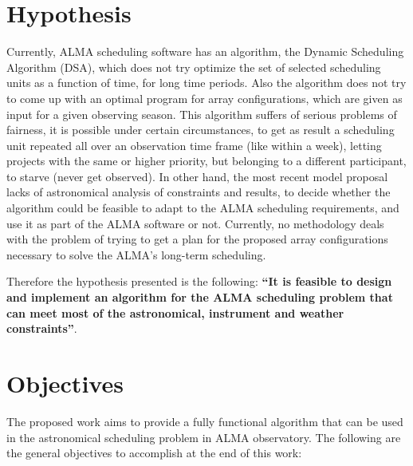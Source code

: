 \section{Hypothesis}

Currently, ALMA scheduling software has an algorithm, the Dynamic Scheduling Algorithm (DSA),
which does not try optimize the set of selected scheduling units
as a function of time, for long time periods. Also the algorithm does not try to come up with an
optimal program for array configurations, which are given as input for a given observing season. This algorithm suffers of
serious problems of fairness, it is possible under certain circumstances, to get as result a
scheduling unit repeated all over an observation time frame (like within a week), letting projects 
with the same or higher priority, but belonging to a different participant, to starve (never get observed).
In other hand, the most recent model proposal lacks of astronomical analysis of constraints and
results, to decide whether the algorithm could be feasible to adapt to the ALMA scheduling requirements,
and use it as part of the ALMA software or not.
Currently, no methodology deals with the problem of trying to get a plan for the proposed
array configurations necessary to solve the ALMA’s long-term scheduling.

Therefore the hypothesis presented is the following:
\textbf{``It is feasible to design and implement an algorithm for the ALMA scheduling problem 
that can meet most of the astronomical, instrument and weather constraints''}.

\section{Objectives}
\label{sec:objectives}
The proposed work aims to provide a fully functional algorithm that can be used in the astronomical scheduling problem in ALMA observatory.
The following are the general objectives to accomplish at the end of this work:


